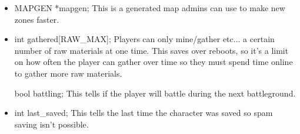 \begin{itemize}
\item  MAPGEN *mapgen;            This is a generated map admins can use to
  make new zones faster.  


 \item int gathered[RAW\_MAX]; Players can only mine/gather etc... a
 certain number of raw materials at one time. This saves over reboots,
 so it's a limit on how often the player can gather over time so they
 must spend time online to gather more raw materials.

  bool battling;                This tells if the player will battle
  during the next battleground.


 \item int last\_saved;        This tells the last time the character
 was saved so spam saving isn't possible.     





\end{itemize}















